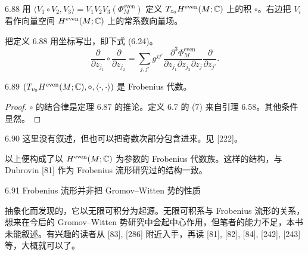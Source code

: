 \begin{definition}{6.88}
  用 $\langle V_1\circ V_2,V_3\rangle=V_1V_2V_3(\Phi_M^{\mathrm{even}})$ 定义 $T_{z_0}H^{\mathrm{even}}(M;\mathbb{C})$ 上的积 $\circ$。右边把 $V_i$ 看作向量空间 $H^{\mathrm{even}}(M;\mathbb{C})$ 上的常系数向量场。
\end{definition}

把定义 6.88 用坐标写出，即下式 (6.24)。
\begin{equation}
  \frac{\partial}{\partial z_{j_1}}\circ\frac{\partial}{\partial z_{j_2}}
  =\sum_{j,j'}g^{jj'}
  \frac{\partial^3\Phi_M^{\mathrm{even}}}{\partial z_{j_1}\partial z_{j_2}\partial z_j}
  \frac{\partial}{\partial z_{j'}} . \tag{6.24}
\end{equation}

\begin{lemma*}{6.89}
  $(T_{v_0}H^{\mathrm{even}}(M;\mathbb{C}),\circ,\langle\cdot,\cdot\rangle)$ 是 Frobenius 代数。
\end{lemma*}

\begin{proof}
  $\circ$ 的结合律是定理 6.87 的推论。定义 6.7 的 (7) 来自引理 6.58。其他条件显然。
\end{proof}


\begin{remark}{6.90}
  这里没有叙述，但也可以把奇数次部分包含进来。见 [222]。
\end{remark}

以上便构成了以 $H^{\mathrm{even}}(M;\mathbb{C})$ 为参数的 Frobenius 代数族。这样的结构，与 Dubrovin [81] 作为 Frobenius 流形研究过的结构一致。

\begin{remark}{6.91}
  Frobenius 流形并非把 Gromov–Witten 势的性质

  抽象化而发现的，它以无限可积分为起源。无限可积系与 Frobenius 流形的关系，想来在今后的 Gromov–Witten 势研究中会起中心作用，但笔者的能力不足，本书未能叙述。有兴趣的读者从 [83], [286] 附近入手，再读 [81], [82], [84], [242], [243] 等，大概就可以了。
\end{remark}

